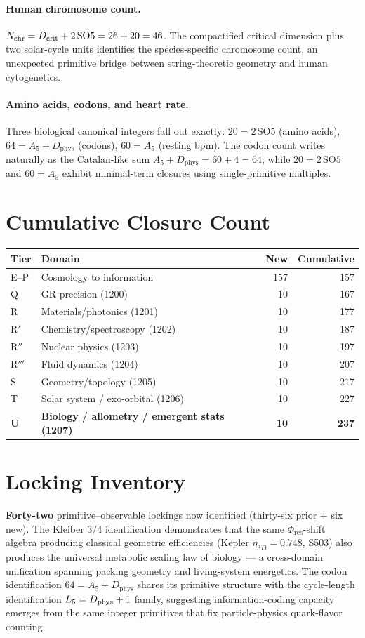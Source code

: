 \documentclass[11pt]{article}
\newcommand{\Phires}{\Phi_{\mathrm{res}}}
\newcommand{\Dphys}{D_{\mathrm{phys}}}
\newcommand{\Dcrit}{D_{\mathrm{crit}}}
\newcommand{\SOfive}{\mathrm{SO5}}
\newcommand{\Afive}{A_{5}}
\begin{document}
\paragraph{Human chromosome count.}
$N_{\rm chr} = \Dcrit + 2\,\SOfive = 26 + 20 = 46$. The compactified
critical dimension plus two solar-cycle units identifies the species-specific
chromosome count, an unexpected primitive bridge between string-theoretic
geometry and human cytogenetics.

\paragraph{Amino acids, codons, and heart rate.}
Three biological canonical integers fall out exactly:
$20 = 2\,\SOfive$ (amino acids),
$64 = \Afive + \Dphys$ (codons),
$60 = \Afive$ (resting bpm).
The codon count writes naturally as the Catalan-like sum
$\Afive + \Dphys = 60 + 4 = 64$, while $20 = 2\,\SOfive$ and
$60 = \Afive$ exhibit minimal-term closures using single-primitive
multiples.

\section{Cumulative Closure Count}

\begin{tabular}{@{}llrr@{}}
\toprule
Tier & Domain & New & Cumulative \\
\midrule
E--P & Cosmology to information & 157 & 157 \\
Q & GR precision (1200) & 10 & 167 \\
R & Materials/photonics (1201) & 10 & 177 \\
R$'$ & Chemistry/spectroscopy (1202) & 10 & 187 \\
R$''$ & Nuclear physics (1203) & 10 & 197 \\
R$'''$ & Fluid dynamics (1204) & 10 & 207 \\
S & Geometry/topology (1205) & 10 & 217 \\
T & Solar system / exo-orbital (1206) & 10 & 227 \\
\textbf{U} & \textbf{Biology / allometry / emergent stats (1207)} & \textbf{10} & \textbf{237} \\
\bottomrule
\end{tabular}

\section{Locking Inventory}
\textbf{Forty-two} primitive--observable lockings now identified
(thirty-six prior + six new). The Kleiber $3/4$ identification
demonstrates that the same $\Phires$-shift algebra producing classical
geometric efficiencies (Kepler $\eta_{3D}=0.748$, S503) also produces the
universal metabolic scaling law of biology --- a cross-domain unification
spanning packing geometry and living-system energetics. The codon
identification $64 = \Afive + \Dphys$ shares its primitive structure with
the cycle-length identification $L_5 = D_{\rm phys}+1$ family, suggesting
information-coding capacity emerges from the same integer primitives that
fix particle-physics quark-flavor counting.
\end{document}
